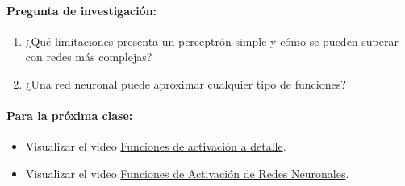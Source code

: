 \documentclass[a4,11pt]{aleph-notas}
\begin{document}
\paragraph{Pregunta de investigación:}  
\begin{enumerate}[leftmargin=*]
    \item ¿Qué limitaciones presenta un perceptrón simple y cómo se pueden superar con redes más complejas?
    \item ¿Una red neuronal puede aproximar cualquier tipo de funciones?
\end{enumerate}

\paragraph{Para la próxima clase:}  
\begin{itemize}
    \item Visualizar el video \href{https://youtu.be/_0wdproot34?si=z6FHp27sh5b4CH32}{Funciones de activación a detalle}.
    \item Visualizar el video \href{https://youtu.be/wzMMyTx7DKk?si=NfsF9j1sd13IsXqO}{Funciones de Activación de Redes Neuronales}.
\end{itemize}
\end{document}
